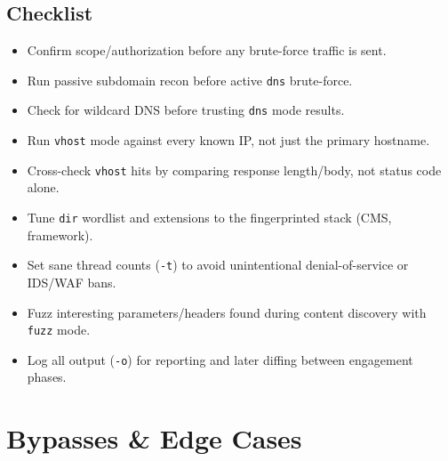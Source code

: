 \documentclass[11pt]{article}
\begin{document}
\subsection{Checklist}
\begin{itemize}[label=$\square$]
    \item Confirm scope/authorization before any brute-force traffic is sent.
    \item Run passive subdomain recon before active \texttt{dns} brute-force.
    \item Check for wildcard DNS before trusting \texttt{dns} mode results.
    \item Run \texttt{vhost} mode against every known IP, not just the primary hostname.
    \item Cross-check \texttt{vhost} hits by comparing response length/body, not status code alone.
    \item Tune \texttt{dir} wordlist and extensions to the fingerprinted stack (CMS, framework).
    \item Set sane thread counts (\texttt{-t}) to avoid unintentional denial-of-service or IDS/WAF bans.
    \item Fuzz interesting parameters/headers found during content discovery with \texttt{fuzz} mode.
    \item Log all output (\texttt{-o}) for reporting and later diffing between engagement phases.
\end{itemize}


\section{Bypasses \& Edge Cases}
\end{document}
